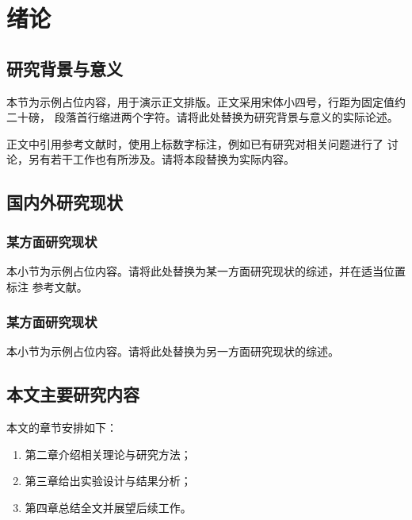 \chapter{绪论}\label{chap:intro}

\section{研究背景与意义}
本节为示例占位内容，用于演示正文排版。正文采用宋体小四号，行距为固定值约二十磅，
段落首行缩进两个字符。请将此处替换为研究背景与意义的实际论述。

正文中引用参考文献时，使用上标数字标注，例如已有研究\cite{ref-journal}对相关问题进行了
讨论，另有若干工作\cite{ref-book,ref-thesis}也有所涉及。请将本段替换为实际内容。

\section{国内外研究现状}

\subsection{某方面研究现状}
本小节为示例占位内容。请将此处替换为某一方面研究现状的综述，并在适当位置标注
参考文献\cite{ref-conf}。

\subsection{某方面研究现状}
本小节为示例占位内容。请将此处替换为另一方面研究现状的综述\cite{ref-en}。

\section{本文主要研究内容}
本文的章节安排如下：
\begin{enumerate}[label={（\arabic*）},leftmargin=*]
  \item 第二章介绍相关理论与研究方法；
  \item 第三章给出实验设计与结果分析；
  \item 第四章总结全文并展望后续工作。
\end{enumerate}

